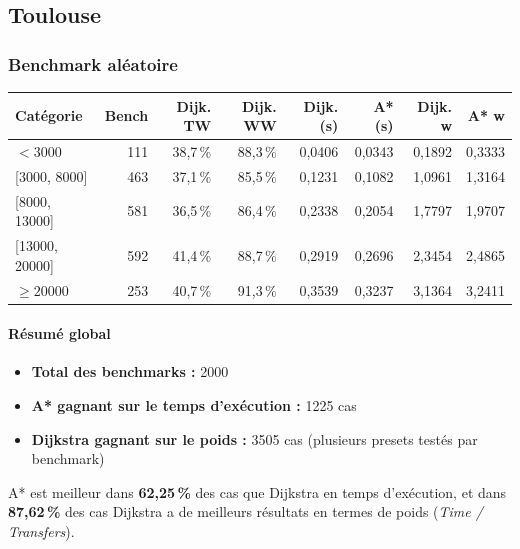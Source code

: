 \documentclass[12pt,a4paper]{article}
\begin{document}
\subsection*{Toulouse}

\subsubsection*{Benchmark aléatoire}

\begin{center}
\small
\begin{tabular}{lrrrrrrr}
\toprule
\textbf{Catégorie} & \textbf{Bench} & \textbf{Dijk. TW} & \textbf{Dijk. WW} & \textbf{Dijk. (s)} & \textbf{A* (s)} & \textbf{Dijk. w} & \textbf{A* w} \\
\midrule
$< 3000$             & 111 & 38,7\,\% & 88,3\,\% & 0,0406 & 0,0343 & 0,1892 & 0,3333 \\
{[3000, 8000]}       & 463 & 37,1\,\% & 85,5\,\% & 0,1231 & 0,1082 & 1,0961 & 1,3164 \\
{[8000, 13000]}      & 581 & 36,5\,\% & 86,4\,\% & 0,2338 & 0,2054 & 1,7797 & 1,9707 \\
{[13000, 20000]}     & 592 & 41,4\,\% & 88,7\,\% & 0,2919 & 0,2696 & 2,3454 & 2,4865 \\
$\geq 20000$         & 253 & 40,7\,\% & 91,3\,\% & 0,3539 & 0,3237 & 3,1364 & 3,2411 \\
\bottomrule
\end{tabular}
\end{center}

\paragraph{Résumé global}
\begin{itemize}
    \item \textbf{Total des benchmarks :} 2000
    \item \textbf{A* gagnant sur le temps d'exécution :} 1225 cas
    \item \textbf{Dijkstra gagnant sur le poids :} 3505 cas (plusieurs presets testés par benchmark)
\end{itemize}

A* est meilleur dans \textbf{62,25\,\%} des cas que Dijkstra en temps d'exécution, et dans \textbf{87,62\,\%} des cas Dijkstra a de meilleurs résultats en termes de poids (\textit{Time / Transfers}).

\end{document}
